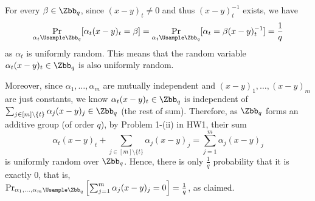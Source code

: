 \begin{answer}[i]
    For every $\beta\in \Zbb_q$, since $(x-y)_t\neq 0$ and thus $(x-y)_t^{-1}$ exists, we have
    \[
        \Pr_{\alpha_t\Usample \Zbb_q}[\alpha_t(x-y)_t = \beta]
        = \Pr_{\alpha_t\Usample \Zbb_q}[\alpha_t= \beta (x-y)_t ^{-1}]
        = \frac{1}{q} 
    \]
    as $\alpha_t$ is uniformly random. This means that the random variable $\alpha_t(x-y)_t\in \Zbb_q$ is also uniformly random. 
    
    Moreover, since $\alpha_1,\ldots, \alpha_m$ are mutually independent and $(x-y)_1,\ldots, (x-y)_m$ are just constants, we know $\alpha_t(x-y)_t\in \Zbb_q$ is independent of $\sum_{j\in [m]\setminus \{t\}} \alpha_j(x-y)_j\in \Zbb_q$ (the rest of sum). Therefore, as $\Zbb_q$ forms an additive group (of order $q$), by Problem 1-(ii) in HW1, their sum
    \[
        \alpha_t(x-y)_t + \sum_{j\in [m]\setminus \{t\}} \alpha_j(x-y)_j = \sum_{j=1}^m \alpha_j(x-y)_j
    \]
    is uniformly random over $\Zbb_q$. Hence, there is only $\frac{1}{q}$ probability that it is exactly $0$, that is, \\ $\Pr_{\alpha_1,\ldots,\alpha_m \Usample \Zbb_q}\left[\sum_{j=1}^m \alpha_j(x-y)_j=0\right] = \frac{1}{q}$, as claimed.
\end{answer}




